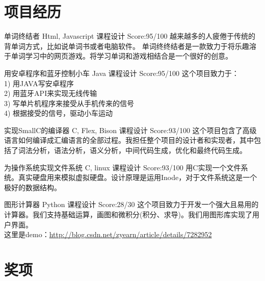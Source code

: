 \documentclass[11pt,a4paper]{moderncv}
\begin{document}
\section{项目经历}

{单词终结者}
{Html, Javascript}
{课程设计}
{Score:95/100}
{
越来越多的人疲倦于传统的背单词方式，比如说单词书或者电脑软件。
单词终终结者是一款致力于将乐趣溶于单词学习中的网页游戏。将学习单词和游戏相结合是一个很好的创意。\\
}

\vspace*{0.2\baselineskip}
{用安卓程序和蓝牙控制小车}
{Java}
{课程设计}
{Score:95/100}
{
这个项目致力于：\\
1) 用JAVA写安卓程序\\
2) 用蓝牙API来实现无线传输\\
3) 写单片机程序来接受从手机传来的信号\\
4) 根据接受的信号，驱动小车运动\\
}

\vspace*{0.2\baselineskip}
{实现SmallC的编译器}
{C, Flex, Bison}
{课程设计}
{Score:93/100}
{
这个项目包含了高级语言如何编译成汇编语言的全部过程。我担任整个项目的设计者和实现者，其中包括了词法分析，语法分析，语义分析，中间代码生成，优化和最终代码生成。\\
}

{为操作系统实现文件系统}
{C, linux}
{课程设计}
{Score:93/100}
{
用C实现一个文件系统。真实硬盘用来模拟虚拟硬盘。设计原理是运用Inode，对于文件系统这是一个极好的数据结构。\\
}


\vspace*{0.2\baselineskip}
{图形计算器}
{Python}
{课程设计}
{Score:28/30}
{
这个项目致力于开发一个强大且易用的计算器。我们支持基础运算，画图和微积分(积分、求导)。我们用图形库实现了用户界面。\\
这里是demo：\url{http://blog.csdn.net/zyearn/article/details/7282952}
}

\section{奖项}
\end{document}
